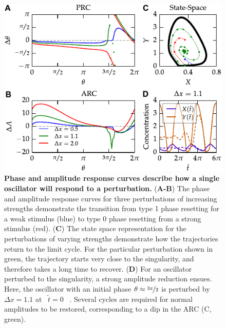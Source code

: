 \documentclass[11pt, letterpaper]{article}
\providecommand{\DIFadd}[1]{{\protect\color{blue}#1}} %
\providecommand{\DIFdel}[1]{{\protect\color{red}}}                      %
\providecommand{\DIFaddFL}[1]{\DIFadd{#1}} %
\providecommand{\DIFdelFL}[1]{\DIFdel{#1}} %
\providecommand{\DIFaddbeginFL}{} %
\providecommand{\DIFaddendFL}{} %
\providecommand{\DIFdelbeginFL}{} %
\providecommand{\DIFdelendFL}{} %
\begin{document}
\begin{figure}[tbp]
  \begin{center}
    \DIFaddbeginFL \includegraphics[width=.75\textwidth]{figures/figure_2.pdf}
    \DIFaddendFL \caption{
{\bfseries \DIFdelbeginFL \DIFdelFL{Single cell amplitude and phase response curves.}%
\DIFdelFL{The
    phase }\DIFdelendFL \DIFaddbeginFL \DIFaddFL{Phase }\DIFaddendFL and amplitude response curves \DIFdelbeginFL \DIFdelFL{determine }\DIFdelendFL \DIFaddbeginFL \DIFaddFL{describe }\DIFaddendFL how a single oscillator will respond to a perturbation.\DIFaddbeginFL }  \DIFaddendFL ({\bfseries A-B}) The phase and amplitude response curves for three perturbations of increasing strengths demonstrate the transition from type 1 phase resetting for a weak stimulus (blue) to type 0 phase resetting from a strong stimulus (red).
({\bfseries C}) The state space representation for the perturbations of varying strengths demonstrate how the trajectories return to the limit cycle.
For the particular perturbation shown in green, the trajectory starts very close to the singularity, and therefore takes a long time to recover.
({\bfseries D}) For an oscillator perturbed to the singularity, a strong amplitude reduction ensues.
Here, the oscillator with an initial phase $\theta \approx \nicefrac{3\pi}{2}$ is perturbed by $\Delta x = 1.1$ at \DIFdelbeginFL \DIFdelFL{\mbox{%
$\hat{t} =
    0$
}%
}\DIFdelendFL \DIFaddbeginFL \DIFaddFL{\mbox{%
$\tilde{t} = 0$
}%
}\DIFaddendFL .
Several cycles are required for normal amplitudes to be restored, corresponding to a dip in the ARC (C, green).}
  \end{center}
\end{figure}
\end{document}
